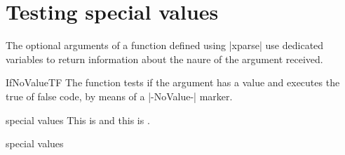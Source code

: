 \section{Testing special values}

The optional arguments of a function defined using |xparse| use dedicated variables to return
information about the naure of the argument received.

\begin{docCommand}{IfNoValueTF}{}
The function tests if the argument has a value and executes the true of false code, by means
of a |-NoValue-| marker. 
\begin{texexample}{special values}{}
\DeclareDocumentCommand{}
    {
            {}
            {\doccmdcolor{\textcolor{#1}{#2}}}
     }
\newcommand\doccmdnocolor[1]{#1}
\newcommand\doccmdcolor[2]{#1 #2}     
This is   and this is .   
\end{texexample}
\end{docCommand}

\begin{texexample}{special values}{}
    {
        \bfseries 
            {\color{red}}
            {\color{#1}}
    }
    {                 }
\begin{allbold}[magenta]
\lorem
\end{allbold}
\end{texexample}



